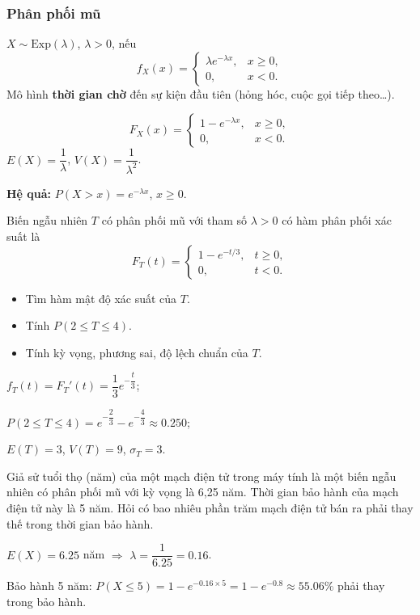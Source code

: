 \documentclass[12pt,a4paper]{article}
\begin{document}
\subsubsection{Phân phối mũ}

\begin{dinhnghia}
  $X \sim \mathrm{Exp}(\lambda)$, $\lambda > 0$, nếu
  \[
    f_X(x) = \begin{cases}
      \lambda e^{-\lambda x}, & x \ge 0, \\
      0, & x < 0.
    \end{cases}
  \]
  Mô hình \textbf{thời gian chờ} đến sự kiện đầu tiên (hỏng hóc, cuộc gọi tiếp theo\ldots).
\end{dinhnghia}

\begin{dinhly}
  \[
    F_X(x) = \begin{cases}
      1 - e^{-\lambda x}, & x \ge 0, \\
      0, & x < 0.
    \end{cases}
  \]
  $E(X) = \dfrac{1}{\lambda}$, \quad $V(X) = \dfrac{1}{\lambda^2}$.

  \textbf{Hệ quả:} $P(X > x) = e^{-\lambda x}$, $x \ge 0$.
\end{dinhly}

\begin{vidu}[title={Thời gian $T$}]
Biến ngẫu nhiên $T$ có phân phối mũ với tham số $\lambda > 0$ có hàm phân phối xác suất là
  \[
    F_T(t) = \begin{cases}
      1 - e^{-t/3}, & t \ge 0, \\
      0, & t < 0.
    \end{cases}
  \]
  \begin{itemize}
    \item Tìm hàm mật độ xác suất của $T$.
    \item Tính $P(2 \le T \le 4)$.
    \item Tính kỳ vọng, phương sai, độ lệch chuẩn của $T$.
  \end{itemize}
$f_T(t) = F_T'(t) = \dfrac{1}{3}e^{-\dfrac{t}{3}}$; 

$P(2 \le T \le 4) = e^{-\dfrac{2}{3}} - e^{-\dfrac{4}{3}} \approx 0.250$;

$E(T) = 3$, $V(T) = 9$, $\sigma_T = 3$.
\end{vidu}

\begin{vidu}[title={Tuổi thọ mạch điện tử}]
Giả sử tuổi thọ (năm) của một mạch điện tử trong máy tính là một biến ngẫu nhiên có phân phối mũ với kỳ vọng là 6,25 năm. Thời gian bảo hành của mạch điện tử này là 5 năm. Hỏi có bao nhiêu phần trăm mạch điện tử bán ra phải thay thế trong thời gian bảo hành.

$E(X) = 6.25$ năm $\Rightarrow$ $\lambda = \dfrac{1}{6.25} = 0.16$.

Bảo hành 5 năm: $P(X \le 5) = 1 - e^{-0.16 \times 5} = 1 - e^{-0.8} \approx 55.06\%$ phải thay trong bảo hành.
\end{vidu}
\end{document}

